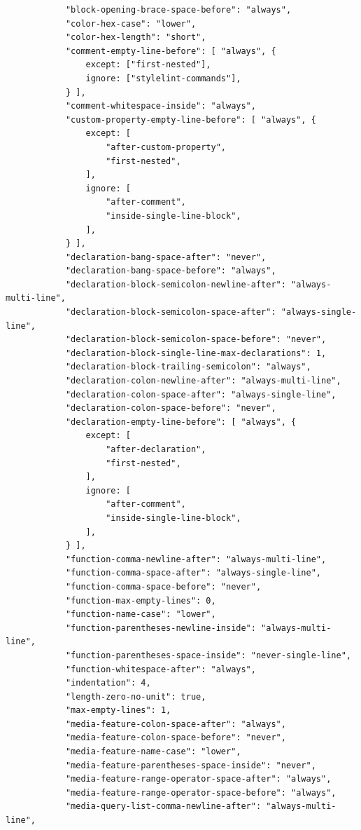 \begin{small}
\begin{verbatim}
            "block-opening-brace-space-before": "always",
            "color-hex-case": "lower",
            "color-hex-length": "short",
            "comment-empty-line-before": [ "always", {
                except: ["first-nested"],
                ignore: ["stylelint-commands"],
            } ],
            "comment-whitespace-inside": "always",
            "custom-property-empty-line-before": [ "always", {
                except: [
                    "after-custom-property",
                    "first-nested",
                ],
                ignore: [
                    "after-comment",
                    "inside-single-line-block",
                ],
            } ],
            "declaration-bang-space-after": "never",
            "declaration-bang-space-before": "always",
            "declaration-block-semicolon-newline-after": "always-multi-line",
            "declaration-block-semicolon-space-after": "always-single-line",
            "declaration-block-semicolon-space-before": "never",
            "declaration-block-single-line-max-declarations": 1,
            "declaration-block-trailing-semicolon": "always",
            "declaration-colon-newline-after": "always-multi-line",
            "declaration-colon-space-after": "always-single-line",
            "declaration-colon-space-before": "never",
            "declaration-empty-line-before": [ "always", {
                except: [
                    "after-declaration",
                    "first-nested",
                ],
                ignore: [
                    "after-comment",
                    "inside-single-line-block",
                ],
            } ],
            "function-comma-newline-after": "always-multi-line",
            "function-comma-space-after": "always-single-line",
            "function-comma-space-before": "never",
            "function-max-empty-lines": 0,
            "function-name-case": "lower",
            "function-parentheses-newline-inside": "always-multi-line",
            "function-parentheses-space-inside": "never-single-line",
            "function-whitespace-after": "always",
            "indentation": 4,
            "length-zero-no-unit": true,
            "max-empty-lines": 1,
            "media-feature-colon-space-after": "always",
            "media-feature-colon-space-before": "never",
            "media-feature-name-case": "lower",
            "media-feature-parentheses-space-inside": "never",
            "media-feature-range-operator-space-after": "always",
            "media-feature-range-operator-space-before": "always",
            "media-query-list-comma-newline-after": "always-multi-line",

\end{verbatim}
\end{small}

